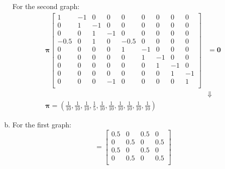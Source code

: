 \documentclass{article}
\begin{document}
\begin{enumerate}[(a)]
        For the second graph:
            \begin{equation*}
                \begin{aligned}
                    \bm{\pi}\begin{bmatrix}
                        1 & -1 & 0 & 0 & 0 & 0 & 0 & 0 & 0\\
                        0 & 1 & -1 & 0 & 0 & 0 & 0 & 0 &0\\
                        0 & 0 & 1 & -1 & 0 & 0 & 0 & 0 &0\\
                        -0.5 & 0 & 1 & 0 & -0.5 & 0 & 0 & 0 &0\\
                        0 & 0 & 0 & 0 & 1 & -1 & 0 & 0 & 0\\
                        0 & 0 & 0 & 0 & 0 & 1 & -1 & 0 & 0\\
                        0 & 0 & 0 & 0 & 0 & 0 & 1 & -1 &0\\
                        0 & 0 & 0 & 0 & 0 & 0 & 0 & 1 &-1\\
                        0 & 0 & 0 & -1 & 0 & 0 & 0 & 0 &1\\
                    \end{bmatrix}&=\bm{0}\\
                    &\Downarrow\\
                    \bm{\pi}=(\frac{1}{10}, \frac{1}{10}, \frac{1}{10}, \frac{1}{5}, \frac{1}{10}, \frac{1}{10}, \frac{1}{10}, \frac{1}{10}, \frac{1}{10}, \frac{1}{10})
                \end{aligned}
            \end{equation*}

        \item For the first graph:
            \begin{equation*}
                [P^2]=\begin{bmatrix}
                    0.5 & 0    & 0.5  & 0\\
                    0   & 0.5  & 0    & 0.5\\
                    0.5 & 0    & 0.5  & 0\\
                    0   & 0.5  & 0    & 0.5\\
                \end{bmatrix}
            \end{equation*}



\end{enumerate}
\end{document}
